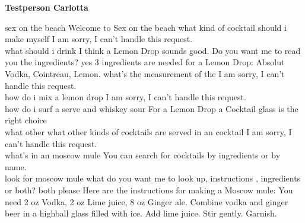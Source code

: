 \documentclass[12pt,letterpaper]{article}
\begin{document}
\textbf{Testperson Carlotta}
\begin{dialogue}
	 sex on the beach
	 Welcome to Sex on the beach
	 what kind of cocktail should i make myself
	 I am sorry, I can't handle this request. \\
	 what should i drink
	 I think a Lemon Drop sounds good. Do you want me to read you the ingredients?
	 yes
	 3 ingredients are needed for a Lemon Drop: Absolut Vodka, Cointreau, Lemon.
	 what's the measurement of the
	 I am sorry, I can't handle this request. \\
	 how do i mix a lemon drop
	 I am sorry, I can't handle this request. \\
	 how do i surf a serve and whiskey sour
	 For a Lemon Drop a Cocktail glass is the right choice \\
	 what other what other kinds of cocktails are served in an cocktail
	 I am sorry, I can't handle this request. \\
	 what's in an moscow mule
	 You can search for cocktails by ingredients or by name. \\
	 look for moscow mule
	 what do you want me to look up, instructions , ingredients or both?
	 both please
	 Here are the instructions for making a Moscow mule: You need 2 oz Vodka, 2 oz Lime juice, 8 oz Ginger ale. Combine vodka and ginger beer in a highball glass filled with ice. Add lime juice. Stir gently. Garnish.

\end{dialogue}
\end{document}
